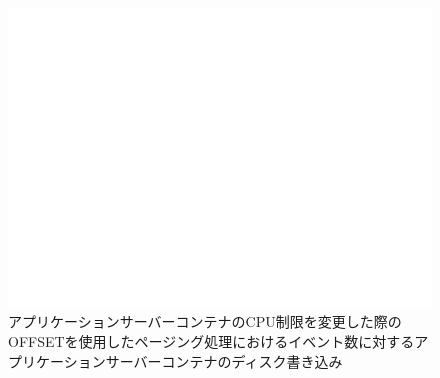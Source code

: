 \documentclass[../../../../../main]{subfiles}
\begin{document}
    \begin{figure}[H]
        \centering
        \includegraphics[width=12cm]{graph}
        \caption{アプリケーションサーバーコンテナのCPU制限を変更した際のOFFSETを使用したページング処理におけるイベント数に対するアプリケーションサーバーコンテナのディスク書き込み}
        \label{fig:paging-offset-change-app-cpu-limit-app-disk-in-app_1024-db_1_1024}
    \end{figure}
\end{document}
